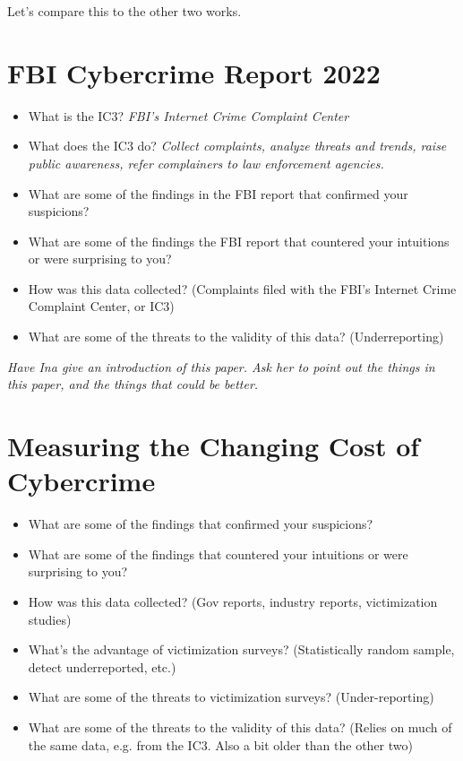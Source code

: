 \documentclass[11pt]{article}
\begin{document}
Let's compare this to the other two works.



\section*{FBI Cybercrime Report 2022}

\begin{itemize}
    \item What is the IC3? {\it FBI's Internet Crime Complaint Center}
    \item What does the IC3 do? {\it Collect complaints, analyze threats and trends, raise public awareness, refer complainers to law enforcement agencies.}
    \item What are some of the findings in the FBI report that confirmed your suspicions?
    \item What are some of the findings the FBI report that countered your intuitions or were surprising to you? 
    \item How was this data collected? (Complaints filed with the FBI's Internet Crime Complaint Center, or IC3)
    \item What are some of the threats to the validity of this data? (Underreporting)
\end{itemize}


{\it Have Ina give an introduction of this paper. Ask her to point out the things in this paper, and the things that could be better.}

\section*{Measuring the Changing Cost of Cybercrime}

\begin{itemize}
    \item What are some of the findings that confirmed your suspicions?
    \item What are some of the findings that countered your intuitions or were surprising to you? 
    \item How was this data collected? (Gov reports, industry reports, victimization studies)
    \item What's the advantage of victimization surveys? (Statistically random sample, detect underreported, etc.)
    \item What are some of the threats to victimization surveys? (Under-reporting)
    \item What are some of the threats to the validity of this data? (Relies on much of the same data, e.g. from the IC3. Also a bit older than the other two)
\end{itemize}
\end{document}
